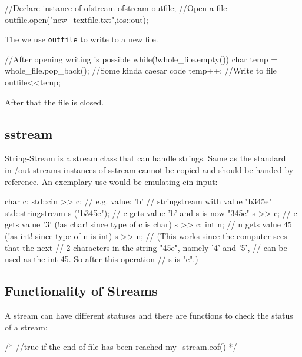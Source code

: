 \documentclass[10pt,a4paper]{scrartcl}
\begin{document}
\begin{multicols*}{2}
\begin{TPCpp}
	//Declare instance of ofstream
	ofstream outfile;
	//Open a file
	outfile.open("new_textfile.txt",ios::out);
\end{TPCpp}

The we use \verb+outfile+ to write to a new file.

\begin{TPCpp}
	//After opening writing is possible
	while(!whole_file.empty()){
		char temp = whole_file.pop_back();
		//Some kinda caesar code
		temp++;
		//Write to file
		outfile<<temp;
	}	
\end{TPCpp}

After that the file is closed.

\begin{TPCpp}
	outfile.close();
	return 0;
}
\end{TPCpp}

\subsection{sstream}
\label{sec:sstream}

String-Stream is a stream class that can handle strings. Same as the standard in-/out-streams instances of sstream cannot be copied and should be handed by reference. An exemplary use would be emulating cin-input:

\begin{TPCpp}
char c;
std::cin >> c; // e.g. value: 'b'
// stringstream with value "b345e"
std::stringstream s ("b345e"); 
// c gets value 'b' and s is now "345e"
s >> c;
// c gets value '3' (!as char! since type of c is char)
s >> c;
int n;
// n gets value 45 (!as int! since type of n is int)
s >> n;
// (This works since the computer sees that the next
// 2 characters in the string "45e", namely '4' and '5',
// can be used as the int 45. So after this operation
// s is "e".)
\end{TPCpp}

\subsection{Functionality of Streams}
\label{sec:FunctionalityOfStreams}

A stream can have different statuses and there are functions to check the status of a stream:

\begin{TPCpp}
/*
//true if the end of file has been reached
my_stream.eof()
*/


\end{TPCpp}
\end{multicols*}
\end{document}
